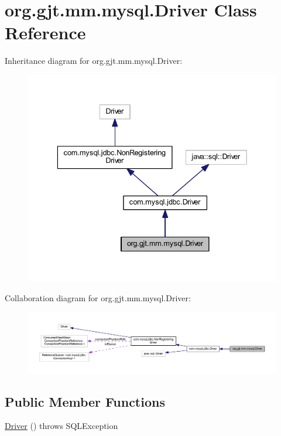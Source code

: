 \hypertarget{classorg_1_1gjt_1_1mm_1_1mysql_1_1_driver}{}\section{org.\+gjt.\+mm.\+mysql.\+Driver Class Reference}
\label{classorg_1_1gjt_1_1mm_1_1mysql_1_1_driver}


Inheritance diagram for org.\+gjt.\+mm.\+mysql.\+Driver\+:
\nopagebreak
\begin{figure}[H]
\begin{center}
\leavevmode
\includegraphics[width=336pt]{classorg_1_1gjt_1_1mm_1_1mysql_1_1_driver__inherit__graph}
\end{center}
\end{figure}


Collaboration diagram for org.\+gjt.\+mm.\+mysql.\+Driver\+:
\nopagebreak
\begin{figure}[H]
\begin{center}
\leavevmode
\includegraphics[width=350pt]{classorg_1_1gjt_1_1mm_1_1mysql_1_1_driver__coll__graph}
\end{center}
\end{figure}
\subsection*{Public Member Functions}
\begin{DoxyCompactItemize}
\item 
\mbox{\hyperlink{classorg_1_1gjt_1_1mm_1_1mysql_1_1_driver_a91faf4f04cf928601187428b4d12a026}{Driver}} ()  throws S\+Q\+L\+Exception 
\end{DoxyCompactItemize}
